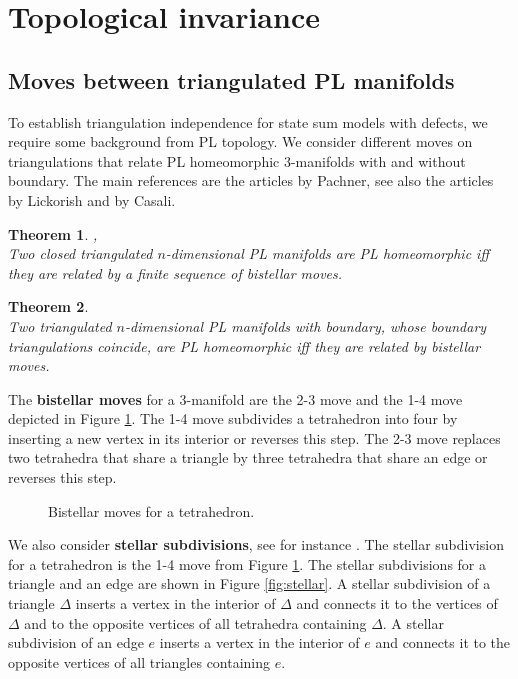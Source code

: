 \documentclass[1.5pt, a4paper]{article}
\newtheorem{theorem}{Theorem}[section]
\begin{document}
 



\section{Topological invariance}
\label{sec:topinvariance}


\subsection{Moves between triangulated PL manifolds}
\label{subsec:PLsubsec}


To establish triangulation independence for  state sum models with defects, we require some background from PL topology. We consider different moves on triangulations that relate PL homeomorphic 3-manifolds with and without boundary. The main references  are the articles \cite{P, Pshell}  by Pachner, see also  the articles \cite{L} by Lickorish and \cite{Cas} by Casali.  


\begin{theorem}\cite[Th.~5.5]{P},\cite[Th.~5.9]{L}\\
Two closed triangulated $n$-dimensional PL manifolds are PL homeomorphic iff they are related by  a finite sequence of bistellar  moves.
\end{theorem}

\begin{theorem}\cite{Cas}\label{th:pachbound}\\
Two triangulated $n$-dimensional PL manifolds with boundary, whose boundary triangulations coincide, are PL homeomorphic iff they are related by bistellar moves.
\end{theorem}


The {\bf bistellar moves} for a 3-manifold are the  2-3 move and the 1-4 move depicted in Figure \ref{fig:bistellar}. The 1-4 move  subdivides a tetrahedron into four  by inserting a new vertex in its interior  or reverses this step. The 2-3 move replaces two tetrahedra that share a triangle by three tetrahedra that share an edge  or reverses this step. 


\begin{figure}
\begin{center}
\def\svgwidth{.41\columnwidth}
 
\end{center}
\caption{Bistellar moves for a tetrahedron.}
\label{fig:bistellar}
\end{figure}


We also consider {\bf stellar subdivisions}, see for instance \cite{RS}. The stellar subdivision for a tetrahedron is  the 1-4 move  from Figure \ref{fig:bistellar}. The stellar subdivisions for a triangle and an edge are shown in Figure \ref{fig:stellar}.
A stellar subdivision of a triangle $\Delta$ inserts a vertex in the interior of $\Delta$ and connects it to the vertices of $\Delta$ and to the  opposite vertices of all tetrahedra containing $\Delta$. 
A stellar subdivision of an edge $e$ inserts a vertex in the interior of $e$ and connects it to the opposite vertices of all triangles containing $e$. 
\end{document}
